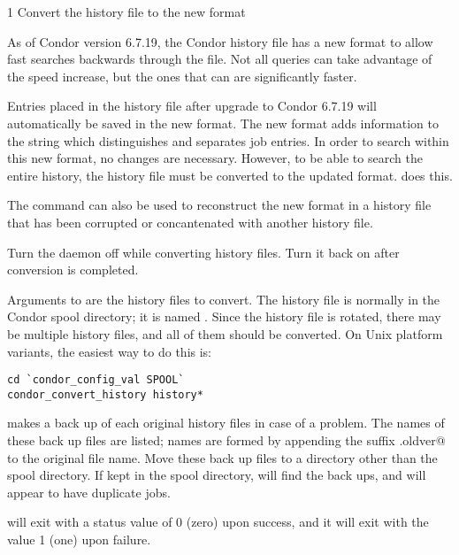 \begin{ManPage}{\label{man-condor-convert-history}}{1}
{Convert the history file to the new format}
\Synopsis 




\Description

As of Condor version 6.7.19,
the Condor history file has a
new format to allow fast searches backwards through the file.
Not all queries can take advantage of the speed increase,
but the ones that can are significantly faster. 

Entries placed in the history file after upgrade
to Condor 6.7.19 will automatically be saved
in the new format.
The new format adds information to the string which
distinguishes and separates job entries.
In order to search within this new format,
no changes are necessary. 
However, to be able to search the entire history,
the history file must be converted to the updated format.
 does this.

The  command can also be used to reconstruct the
new format in a history file that has been corrupted or concantenated with
another history file.

Turn the  daemon off while converting 
history files.
Turn it back on after conversion is completed.

Arguments to  are the
history files to convert.
The history file is normally in the Condor spool directory;
it is named .
Since the history file is rotated,
there may be multiple history files, and all of them should be
converted. On Unix platform variants, the easiest way to do this is:

\begin{verbatim}
cd `condor_config_val SPOOL`
condor_convert_history history*
\end{verbatim}

 makes a
back up of each original history files in case of a problem.
The names of these back up files are listed;
names are formed by appending the suffix \verb@.oldver@
to the original file name.
Move these back up files to a directory other than
the spool directory.
If kept in the spool directory,
 will find the back ups,
and will appear to have duplicate jobs. 

\ExitStatus

 will exit with a status value of 0 (zero)
upon success, and it will exit with the value 1 (one) upon failure.

\end{ManPage}
